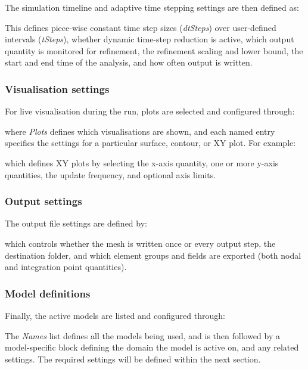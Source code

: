 \documentclass[3p]{elsarticle} %
\newcommand{\CodeSnipU}[4]{}
\begin{document}
The simulation timeline and adaptive time stepping settings are then defined as:
\CodeSnipU{TestCases/TriAxialCompression/TriAxial.json}{98}{108}{TestCases/TriAxialCompression/TriAxial.json}
This defines piece-wise constant time step sizes (\textit{dtSteps}) over user-defined intervals (\textit{tSteps}), whether dynamic time-step reduction is active, which output quantity is monitored for refinement, the refinement scaling and lower bound, the start and end time of the analysis, and how often output is written.

\subsubsection{Visualisation settings}
For live visualisation during the run, plots are selected and configured through:
\CodeSnipU{TestCases/TriAxialCompression/TriAxial.json}{109}{112}{TestCases/TriAxialCompression/TriAxial.json}
where \textit{Plots} defines which visualisations are shown, and each named entry specifies the settings for a particular surface, contour, or XY plot. For example:
\CodeSnipU{TestCases/TriAxialCompression/TriAxial.json}{159}{179}{TestCases/TriAxialCompression/TriAxial.json}
which defines XY plots by selecting the x-axis quantity, one or more y-axis quantities, the update frequency, and optional axis limits.

\subsubsection{Output settings}
The output file settings are defined by:
\CodeSnipU{TestCases/TriAxialCompression/TriAxial.json}{181}{189}{TestCases/TriAxialCompression/TriAxial.json}
which controls whether the mesh is written once or every output step, the destination folder, and which element groups and fields are exported (both nodal and integration point quantities).

\subsubsection{Model definitions}
Finally, the active models are listed and configured through:
\CodeSnipU{TestCases/TriAxialCompression/TriAxial.json}{190}{193}{TestCases/TriAxialCompression/TriAxial.json}
The \textit{Names} list defines all the models being used, and is then followed by a model-specific block defining the domain the model is active on, and any related settings. The required settings will be defined within the next section. 
\end{document}
